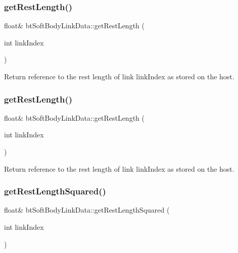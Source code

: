 \subsubsection{\texorpdfstring{get\+Rest\+Length()}{getRestLength()}\hspace{0.1cm}{\footnotesize\ttfamily [1/2]}}
{\footnotesize\ttfamily float\& bt\+Soft\+Body\+Link\+Data\+::get\+Rest\+Length (\begin{DoxyParamCaption}\item[{int}]{link\+Index }\end{DoxyParamCaption})\hspace{0.3cm}{\ttfamily [inline]}}

Return reference to the rest length of link link\+Index as stored on the host. \mbox{\label{classbtSoftBodyLinkData_a2552fa98541e800fc6de8ef7ec2a6a8e}} 
\subsubsection{\texorpdfstring{get\+Rest\+Length()}{getRestLength()}\hspace{0.1cm}{\footnotesize\ttfamily [2/2]}}
{\footnotesize\ttfamily float\& bt\+Soft\+Body\+Link\+Data\+::get\+Rest\+Length (\begin{DoxyParamCaption}\item[{int}]{link\+Index }\end{DoxyParamCaption})\hspace{0.3cm}{\ttfamily [inline]}}

Return reference to the rest length of link link\+Index as stored on the host. \mbox{\label{classbtSoftBodyLinkData_a7ea5bd9cf45bdf9ae4872437e0f867b8}} 
\subsubsection{\texorpdfstring{get\+Rest\+Length\+Squared()}{getRestLengthSquared()}\hspace{0.1cm}{\footnotesize\ttfamily [1/2]}}
{\footnotesize\ttfamily float\& bt\+Soft\+Body\+Link\+Data\+::get\+Rest\+Length\+Squared (\begin{DoxyParamCaption}\item[{int}]{link\+Index }\end{DoxyParamCaption})\hspace{0.3cm}{\ttfamily [inline]}}

